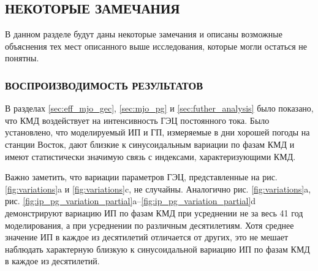 \subsection{НЕКОТОРЫЕ ЗАМЕЧАНИЯ}

В данном разделе будут даны некоторые замечания и описаны возможные объяснения тех мест описанного выше исследования, которые могли остаться не понятны.

\subsubsection{ВОСПРОИЗВОДИМОСТЬ РЕЗУЛЬТАТОВ}

В разделах \ref{sec:eff_mjo_gec}, \ref{sec:mjo_pg} и \ref{sec:futher_analysis} было показано, что КМД воздействует на интенсивность ГЭЦ постоянного тока. Было установлено, что моделируемый ИП и ГП, измеряемые в дни хорошей погоды на станции Восток, дают близкие к синусоидальным вариации по фазам КМД и имеют статистически значимую связь с индексами, характеризующими КМД.

Важно заметить, что вариации параметров ГЭЦ, представленные на рис. \ref{fig:variations}{a} и  \ref{fig:variations}{c}, не случайны. Аналогично рис. \ref{fig:variations}{a}, рис. \ref{fig:ip_pg_variation_partial}{a}--\ref{fig:ip_pg_variation_partial}{d} демонстрируют вариацию ИП по фазам КМД при усреднении не за весь 41 год моделирования, а при усреднении по различным десятилетиям. Хотя среднее значение ИП в каждое из десятилетий отличается от других, это не мешает наблюдать характерную близкую к синусоидальной вариацию ИП по фазам КМД в каждое из десятилетий.

